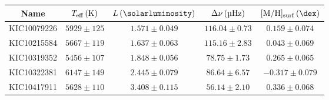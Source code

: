 \begin{tabular}{ccccc}
\toprule
\textbf{Name} & $T_\mathrm{eff}\,(\si{\kelvin})$ & $L\,(\si{\solarluminosity})$ & $\Delta\nu\,(\si{\micro\hertz})$ & $\metallicity_\mathrm{surf}\,(\si{\dex})$ \\
\midrule
  KIC10079226 &            $5929\pm125$ &              $1.571\pm0.049$ &             $116.04\pm0.73$ &                           $0.159\pm0.074$ \\
  KIC10215584 &            $5667\pm119$ &              $1.637\pm0.063$ &             $115.16\pm2.83$ &                           $0.043\pm0.069$ \\
  KIC10319352 &            $5456\pm107$ &              $1.848\pm0.056$ &              $78.75\pm1.73$ &                           $0.265\pm0.065$ \\
  KIC10322381 &            $6147\pm149$ &              $2.445\pm0.079$ &              $86.64\pm6.57$ &                          $-0.317\pm0.079$ \\
  KIC10417911 &            $5628\pm110$ &              $3.408\pm0.115$ &              $56.14\pm2.10$ &                           $0.336\pm0.068$ \\
\bottomrule
\end{tabular}
